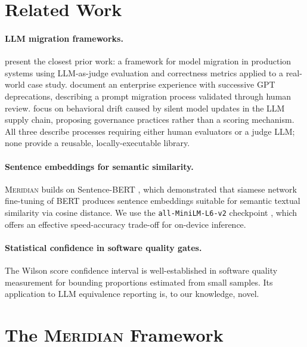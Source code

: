 \documentclass[11pt,a4paper]{article}
\begin{document}
\section{Related Work}

\paragraph{LLM migration frameworks.}
\citet{arXiv2604.27082} present the closest prior work: a framework for model migration
in production systems using LLM-as-judge evaluation and correctness metrics applied
to a real-world case study.
\citet{arXiv2507.05573} document an enterprise experience with successive GPT deprecations,
describing a prompt migration process validated through human review.
\citet{arXiv2604.27789} focus on behavioral drift caused by silent model updates in the
LLM supply chain, proposing governance practices rather than a scoring mechanism.
All three describe processes requiring either human evaluators or a judge LLM;
none provide a reusable, locally-executable library.

\paragraph{Sentence embeddings for semantic similarity.}
\textsc{Meridian} builds on Sentence-BERT \citep{reimers-gurevych-2019-sentence},
which demonstrated that siamese network fine-tuning of BERT produces sentence
embeddings suitable for semantic textual similarity via cosine distance.
We use the \texttt{all-MiniLM-L6-v2} checkpoint \citep{wang2024minilm}, which
offers an effective speed-accuracy trade-off for on-device inference.

\paragraph{Statistical confidence in software quality gates.}
The Wilson score confidence interval \citep{wilson1927} is well-established in
software quality measurement for bounding proportions estimated from small samples.
Its application to LLM equivalence reporting is, to our knowledge, novel.

\section{The \textsc{Meridian} Framework}
\end{document}
